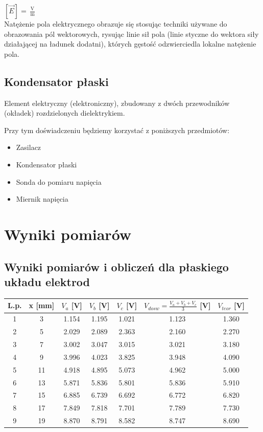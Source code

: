 \documentclass[a4paper,12pt]{article}
\begin{document}
\begin{justify}
$\left[{\vec {E}}\right]={\frac {\operatorname {V} }{\operatorname {m} }}$ \\

Natężenie pola elektrycznego obrazuje się stosując techniki używane do obrazowania pól wektorowych, rysując linie sił pola (linie styczne do wektora siły działającej na ładunek dodatni), których gęstość odzwierciedla lokalne natężenie pola. \cite{npe}

\subsection{Kondensator płaski}

Element elektryczny (elektroniczny), zbudowany z dwóch przewodników (okładek) rozdzielonych dielektrykiem. \cite{konder}




Przy tym doświadczeniu będziemy korzystać z poniższych przedmiotów:
\begin{itemize}
\item Zasilacz
\item Kondensator płaski
\item Sonda do pomiaru napięcia
\item Miernik napięcia
\end{itemize}

\section{Wyniki pomiarów}

\subsection{Wyniki pomiarów i obliczeń dla płaskiego układu elektrod}

\begin{center}
\begin{tabular}{ |c|c|c|c|c|c|c| }
\hline
L.p. & x [mm] & $V_{a}$ [V] & $V_{b}$ [V] & $V_{c}$ [V] & $V_{dosw} = \frac{V_{a} + V_{b} + V_{c}}{3} $ [V] & $V_{teor}$ [V] \\
\hline
1 & 3 & 1.154 & 1.195 & 1.021 & 1.123 & 1.360 \\
\hline
2 & 5 & 2.029 & 2.089 & 2.363 & 2.160 & 2.270 \\
\hline
3 & 7 & 3.002 & 3.047 & 3.015 & 3.021 & 3.180 \\
\hline
4 & 9 & 3.996 & 4.023 & 3.825 & 3.948 & 4.090 \\
\hline
5 & 11 & 4.918 & 4.895 & 5.073 & 4.962 & 5.000 \\
\hline
6 & 13 & 5.871 & 5.836 & 5.801 & 5.836 & 5.910 \\
\hline
7 & 15 & 6.885 & 6.739 & 6.692 & 6.772 & 6.820 \\
\hline
8 & 17 & 7.849 & 7.818 & 7.701 & 7.789 & 7.730 \\
\hline
9 & 19 & 8.870 & 8.791 & 8.582 & 8.747 & 8.690 \\
\hline
\end{tabular}
\end{center}


\end{justify}
\end{document}
